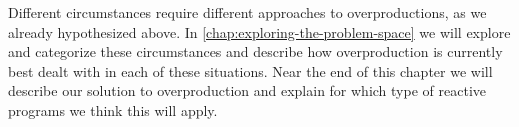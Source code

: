 Different circumstances require different approaches to overproductions, as we already hypothesized above. In \autoref{chap:exploring-the-problem-space} we will explore and categorize these circumstances and describe how overproduction is currently best dealt with in each of these situations. Near the end of this chapter we will describe our solution to overproduction and explain for which type of reactive programs we think this will apply.

